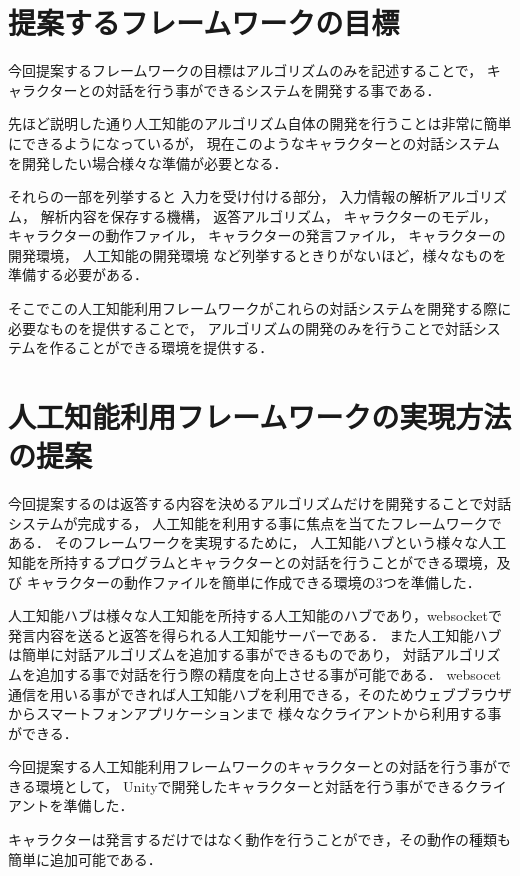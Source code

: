 \section{提案するフレームワークの目標}
今回提案するフレームワークの目標はアルゴリズムのみを記述することで，
キャラクターとの対話を行う事ができるシステムを開発する事である．

先ほど説明した通り人工知能のアルゴリズム自体の開発を行うことは非常に簡単にできるようになっているが，
現在このようなキャラクターとの対話システムを開発したい場合様々な準備が必要となる．

それらの一部を列挙すると
入力を受け付ける部分，
入力情報の解析アルゴリズム，
解析内容を保存する機構，
返答アルゴリズム，
キャラクターのモデル，
キャラクターの動作ファイル，
キャラクターの発言ファイル，
キャラクターの開発環境，
人工知能の開発環境
など列挙するときりがないほど，様々なものを準備する必要がある．

そこでこの人工知能利用フレームワークがこれらの対話システムを開発する際に必要なものを提供することで，
アルゴリズムの開発のみを行うことで対話システムを作ることができる環境を提供する．

\section{人工知能利用フレームワークの実現方法の提案}
今回提案するのは返答する内容を決めるアルゴリズムだけを開発することで対話システムが完成する，
人工知能を利用する事に焦点を当てたフレームワークである．
そのフレームワークを実現するために，
人工知能ハブという様々な人工知能を所持するプログラムとキャラクターとの対話を行うことができる環境，及び
キャラクターの動作ファイルを簡単に作成できる環境の3つを準備した．

人工知能ハブは様々な人工知能を所持する人工知能のハブであり，websocketで発言内容を送ると返答を得られる人工知能サーバーである．
また人工知能ハブは簡単に対話アルゴリズムを追加する事ができるものであり，
対話アルゴリズムを追加する事で対話を行う際の精度を向上させる事が可能である．
websocet通信を用いる事ができれば人工知能ハブを利用できる，そのためウェブブラウザからスマートフォンアプリケーションまで
様々なクライアントから利用する事ができる．

今回提案する人工知能利用フレームワークのキャラクターとの対話を行う事ができる環境として，
Unityで開発したキャラクターと対話を行う事ができるクライアントを準備した．

キャラクターは発言するだけではなく動作を行うことができ，その動作の種類も簡単に追加可能である．

